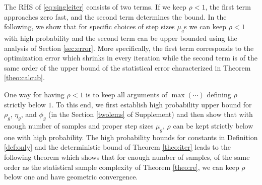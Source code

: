 The RHS of \eqref{eq:singleiter} consists of two terms.
If we keep $\rho < 1$, the first term approaches zero fast, and the second term determines the bound. 
In the following, we show that for specific choices of step sizes $\mu_g$s we can keep $\rho < 1$ with high probability and the second term can be upper bounded using the analysis of Section \ref{sec:error}.
More specifically, the first term corresponds to the optimization error which shrinks in every iteration while the second term is of the same order of the upper bound of the statistical error characterized in Theorem \ref{theo:calcub}.

One way for having $\rho < 1$ is to keep all arguments of $\max(\cdots)$  defining $\rho$ strictly below $1$. %
To this end, we first establish high probability upper bound for $\rho_g$, $\eta_g$, and $\phi_g$ (in the Section \ref{twolems} of Supplement) and then show that with enough number of samples and proper step sizes $\mu_g$, $\rho$ can be kept strictly below one with high probability. %
The high probability bounds for constants in Definition \ref{def:only} and the deterministic bound of Theorem \ref{theo:iter} leads to the following theorem which shows that for enough number of samples, of the same order as the statistical sample complexity of  Theorem \ref{theo:re}, we can keep $\rho$ below one and have geometric convergence.






